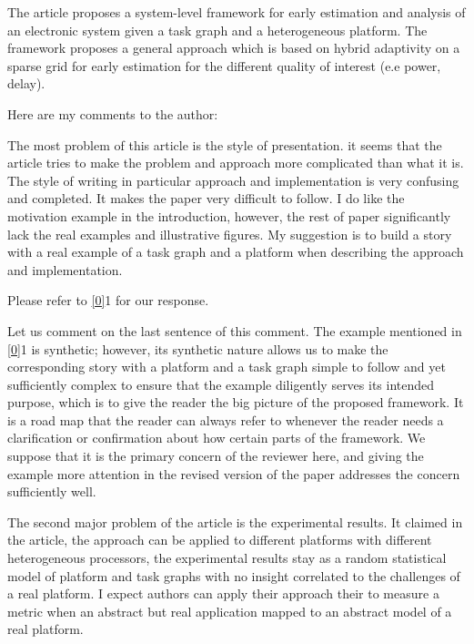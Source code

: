 \begin{reviewer}
The article proposes a system-level framework for early estimation and analysis
of an electronic system given a task graph and a heterogeneous platform. The
framework proposes a general approach which is based on hybrid adaptivity on a
sparse grid  for early estimation for the different quality of interest (e.e
power, delay).

Here are my comments to the author:

The most problem of this article is the style of presentation. it seems that the
article tries to make the problem and approach more complicated than what it is.
The style of writing in particular approach and implementation is very confusing
and completed. It makes the paper very difficult to follow. I do like the
motivation example in the introduction, however, the rest of paper significantly
lack the real examples and illustrative figures. My suggestion is to build a
story with a real example of a task graph and a platform when describing the
approach and implementation.
\end{reviewer}

\begin{authors}
Please refer to \cref{0}{1} for our response.

Let us comment on the last sentence of this comment. The example mentioned in
\cref{0}{1} is synthetic; however, its synthetic nature allows us to make the
corresponding story with a platform and a task graph simple to follow and yet
sufficiently complex to ensure that the example diligently serves its intended
purpose, which is to give the reader the big picture of the proposed framework.
It is a road map that the reader can always refer to whenever the reader needs a
clarification or confirmation about how certain parts of the framework. We
suppose that it is the primary concern of the reviewer here, and giving the
example more attention in the revised version of the paper addresses the concern
sufficiently well.
\end{authors}

\begin{reviewer}
The second major problem of the article is the experimental results. It claimed
in the article, the approach can be applied to different platforms with
different heterogeneous processors, the experimental results stay as a random
statistical model of platform and task graphs with no insight correlated to the
challenges of a real platform. I expect authors can apply their approach their
to measure a metric when an abstract but real application mapped to an abstract
model of a real platform.
\end{reviewer}

